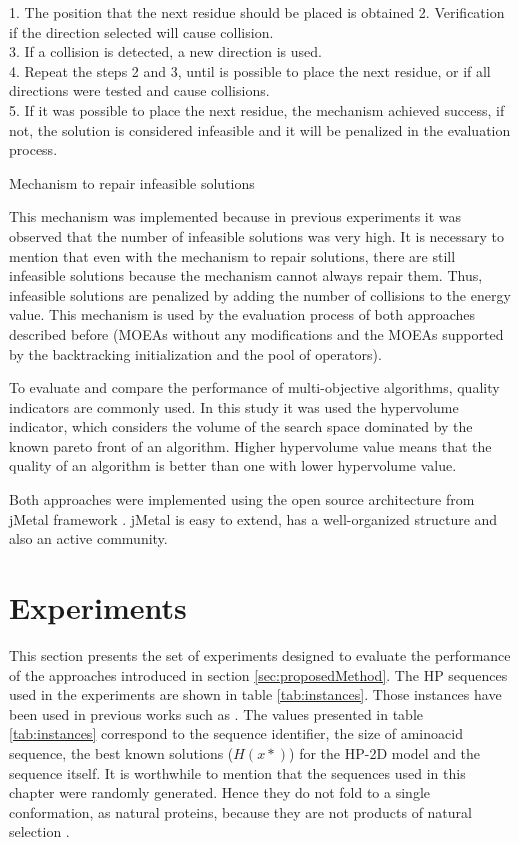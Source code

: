 \begin{algorithm}[h]
	1. The position that the next residue should be placed is obtained 
	2. Verification if the direction selected will cause collision.\\
	3. If a collision is detected, a new direction is used.\\
	4. Repeat the steps 2 and 3, until is possible to place the next residue, or if all directions were tested and cause collisions.\\
	5. If it was possible to place the next residue, the mechanism achieved success, if not, the solution is considered infeasible and it will be penalized in the evaluation process.
	\caption{Mechanism to repair infeasible solutions}
	\label{algo:reparacao}
\end{algorithm}


This mechanism was implemented because in previous experiments it was observed that the number of infeasible solutions was very high. It is necessary to mention that even with the mechanism to repair solutions, there are still infeasible solutions because the mechanism cannot always repair them. Thus, infeasible solutions are penalized by adding the number of collisions to the energy value. This mechanism is used by the evaluation process of both approaches described before (MOEAs without any modifications and the MOEAs supported by the backtracking initialization and the pool of operators).

To evaluate and compare the performance of multi-objective algorithms, quality indicators are commonly used. In this study it was used the hypervolume indicator, which considers the volume of the search space dominated by the known pareto front \cite{zitzler2003performance} of an algorithm. Higher hypervolume value means that the quality of an algorithm is better than one with lower hypervolume value.


Both approaches were implemented using the open source architecture from  jMetal framework \cite{durillo2011jmetal}.  jMetal is easy to extend, has a well-organized structure and also an active community. 


\section{Experiments} \label{sec:experiments}


This section presents the set of experiments designed to evaluate the performance of the approaches introduced in section \ref{sec:proposedMethod}. The HP sequences used in the experiments are shown in table \ref{tab:instances}. Those instances have been used in previous works such as \cite{bastolla1997testing,shmygelska2002ant,unger1993genetic,cotta2003protein, santana2004protein,shmygelska2003improved,lesh2003complete}. The values presented in table \ref{tab:instances} correspond to the sequence identifier, the size of aminoacid sequence, the best known solutions ($H(x*)$) for the HP-2D model and the sequence itself. It is worthwhile to mention that the sequences used in this chapter were randomly generated. Hence they do not fold to a single conformation, as natural proteins, because they are not products of natural selection \cite{chan2001perspectives}.

